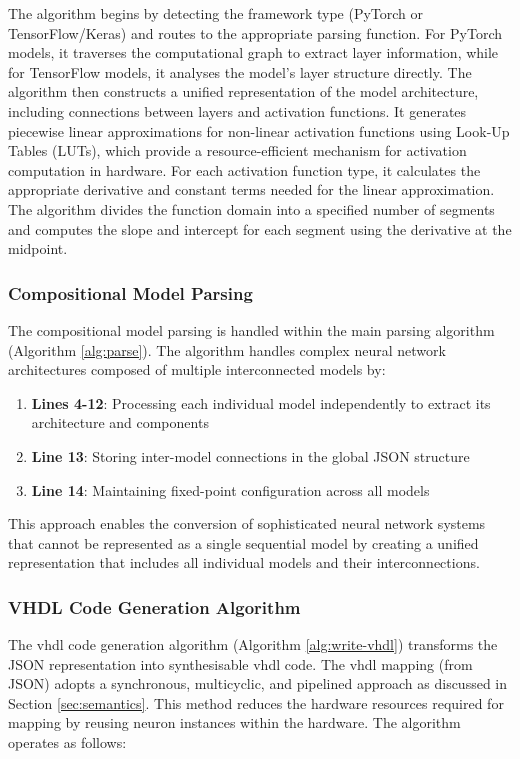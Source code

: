 The algorithm begins by detecting the framework type (PyTorch or TensorFlow/Keras) and routes to the appropriate parsing function. For PyTorch models, it traverses the computational graph to extract layer information, while for TensorFlow models, it analyses the model's layer structure directly. The algorithm then constructs a unified representation of the model architecture, including connections between layers and activation functions. It generates piecewise linear approximations for non-linear activation functions using Look-Up Tables (LUTs), which provide a resource-efficient mechanism for activation computation in hardware. For each activation function type, it calculates the appropriate derivative and constant terms needed for the linear approximation. The algorithm divides the function domain into a specified number of segments and computes the slope and intercept for each segment using the derivative at the midpoint.


\subsubsection{Compositional Model Parsing}
The compositional model parsing is handled within the main parsing algorithm (Algorithm \ref{alg:parse}). The algorithm handles complex neural network architectures composed of multiple interconnected models by:

\begin{enumerate}
    \item \textbf{Lines 4-12}: Processing each individual model independently to extract its architecture and components
    \item \textbf{Line 13}: Storing inter-model connections in the global JSON structure
    \item \textbf{Line 14}: Maintaining fixed-point configuration across all models
\end{enumerate}

This approach enables the conversion of sophisticated neural network systems that cannot be represented as a single sequential model by creating a unified representation that includes all individual models and their interconnections.

\subsubsection{VHDL Code Generation Algorithm}
The \gls{vhdl} code generation algorithm (Algorithm \ref{alg:write-vhdl}) transforms the JSON representation into synthesisable \gls{vhdl} code. The \gls{vhdl} mapping (from JSON) adopts a synchronous, multicyclic, and pipelined approach as discussed in Section \ref{sec:semantics}. This method reduces the hardware resources required for mapping by reusing neuron instances within the hardware. The algorithm operates as follows:

